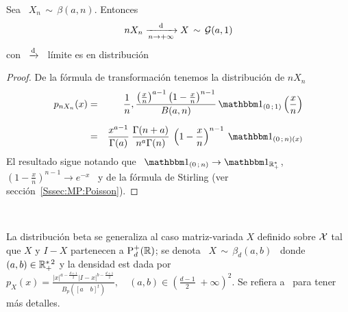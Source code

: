 \begin{lema}
\label{Lem:GamaLimiteBeta}
%
  Sea \ $X_n \, \sim \, \beta(a,n)$. Entonces
  \[
  n X_n \xrightarrow[n \to +\infty]{\mathrm{d}} X \, \sim \, \mathcal{G}(a,1)
  \]
  con \ $\displaystyle \xrightarrow[]{\mathrm{d}}$ \ l\'imite es en distribuci\'on
\end{lema}
%
\begin{proof}
  De la f\'ormula de transformaci\'on tenemos la distribuci\'on de $n X_n$
  \begin{eqnarray*}
  p_{n X_n}(x) & = & \frac{1}{n} , \frac{\left( \frac{x}{n} \right)^{a-1} \left( 1
  - \frac{x}{n} \right)^{n-1}}{B(a,n)} \, \un_{(0 \; 1)}\left( \frac{x}{n} \right)\\[2mm]
  & = & \frac{x^{a-1}}{\Gamma(a)} \: \frac{\Gamma(n+a)}{n^a \Gamma(n)} \: \left( 1 -
  \frac{x}{n} \right)^{n-1} \: \un_{(0 \; n)(x)}
  \end{eqnarray*}
  El resultado sigue  notando que \ $\un_{(0 \;  n)} \to \un_{\Rset_+^*}$, \quad
  $\left(  1 -  \frac{x}{n} \right)^{n-1}  \to e^{-x}$  \ y  de la  f\'ormula de
  Stirling (ver secci\'on~\ref{Sssec:MP:Poisson}).
\end{proof}

\

La distribuci\'on beta  se generaliza al caso matriz-variada  $X$ definido sobre
$\mathcal{X}$ tal que $X$ y $I-X$ partenecen  a $\mathrm{P}_d^+(\mathbb{R})$; se denota \ $X \, \sim \,
\beta_d(a,b)$ \ donde \ $(a,b) \in \mathbb{R}_+^{*  \, 2}$ y la densidad est dada por
$\displaystyle   p_X(x)    =   \frac{|x|^{a   -    \frac{d+1}{2}}   |I-x|^{b   -
    \frac{d+1}{2}}}{B_p\left([a  \quad  b]^t\right)},  \quad  (a,b)  \in  \left(
  \frac{d-1}{2} \; +\infty \right)^2$. Se refiera a~\cite[Cap.~5]{GupNag99} para
tener m\'as detalles.
